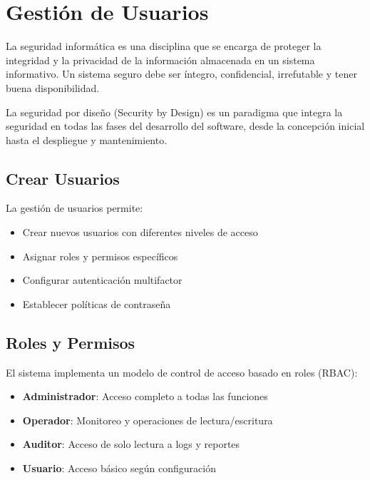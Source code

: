 
\chapter{Gestión de Usuarios}

La seguridad informática es una disciplina que se encarga de proteger la integridad y la privacidad de la información almacenada en un sistema informativo. Un sistema seguro debe ser íntegro, confidencial, irrefutable y tener buena disponibilidad.

La seguridad por diseño (Security by Design) es un paradigma que integra la seguridad en todas las fases del desarrollo del software, desde la concepción inicial hasta el despliegue y mantenimiento.

\section{Crear Usuarios}

La gestión de usuarios permite:

\begin{itemize}
    \item Crear nuevos usuarios con diferentes niveles de acceso
    \item Asignar roles y permisos específicos
    \item Configurar autenticación multifactor
    \item Establecer políticas de contraseña
\end{itemize}

\section{Roles y Permisos}

El sistema implementa un modelo de control de acceso basado en roles (RBAC):

\begin{itemize}
    \item \textbf{Administrador}: Acceso completo a todas las funciones
    \item \textbf{Operador}: Monitoreo y operaciones de lectura/escritura
    \item \textbf{Auditor}: Acceso de solo lectura a logs y reportes
    \item \textbf{Usuario}: Acceso básico según configuración
\end{itemize}

